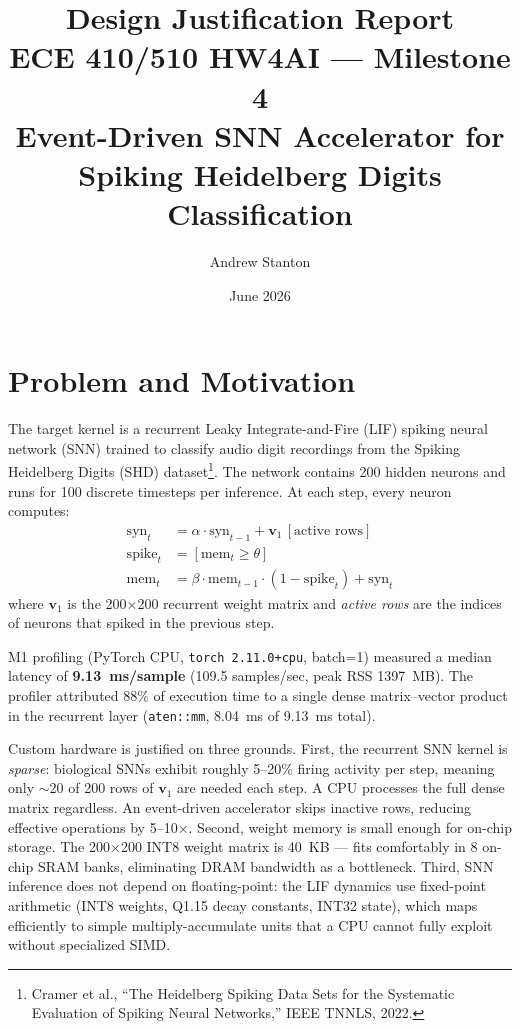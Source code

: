 \documentclass[11pt,letterpaper]{article}
\title{\textbf{Design Justification Report}\\
\large ECE 410/510 HW4AI --- Milestone 4\\
Event-Driven SNN Accelerator for Spiking Heidelberg Digits Classification}
\author{Andrew Stanton}
\date{June 2026}
\begin{document}
\maketitle
\tableofcontents
\newpage

\section{Problem and Motivation}

The target kernel is a recurrent Leaky Integrate-and-Fire (LIF) spiking neural
network (SNN) trained to classify audio digit recordings from the Spiking
Heidelberg Digits (SHD) dataset\footnote{Cramer et al., ``The Heidelberg Spiking Data Sets for the Systematic Evaluation of Spiking Neural Networks,'' IEEE TNNLS, 2022.}. The network contains 200 hidden
neurons and runs for 100 discrete timesteps per inference. At each step, every
neuron computes:
\begin{align}
  \text{syn}_t &= \alpha \cdot \text{syn}_{t-1} + \mathbf{v}_1\,[\text{active rows}] \\
  \text{spike}_t &= [\text{mem}_t \geq \theta] \\
  \text{mem}_t &= \beta \cdot \text{mem}_{t-1} \cdot (1 - \text{spike}_t) + \text{syn}_t
\end{align}
where $\mathbf{v}_1$ is the 200$\times$200 recurrent weight matrix and
\emph{active rows} are the indices of neurons that spiked in the previous step.

M1 profiling (PyTorch CPU, \texttt{torch 2.11.0+cpu}, batch=1) measured a
median latency of \textbf{9.13~ms/sample} (109.5 samples/sec, peak RSS 1397~MB).
The profiler attributed 88\% of execution time to a single dense matrix--vector
product in the recurrent layer (\texttt{aten::mm}, 8.04~ms of 9.13~ms total).

Custom hardware is justified on three grounds.
First, the recurrent SNN kernel is \emph{sparse}: biological SNNs exhibit roughly
5--20\% firing activity per step, meaning only $\sim$20 of 200 rows of
$\mathbf{v}_1$ are needed each step. A CPU processes the full dense matrix
regardless. An event-driven accelerator skips inactive rows, reducing effective
operations by 5--10$\times$.
Second, weight memory is small enough for on-chip storage. The 200$\times$200
INT8 weight matrix is 40~KB --- fits comfortably in 8 on-chip SRAM banks,
eliminating DRAM bandwidth as a bottleneck.
Third, SNN inference does not depend on floating-point: the LIF dynamics use
fixed-point arithmetic (INT8 weights, Q1.15 decay constants, INT32 state), which
maps efficiently to simple multiply-accumulate units that a CPU cannot fully
exploit without specialized SIMD.
\end{document}
